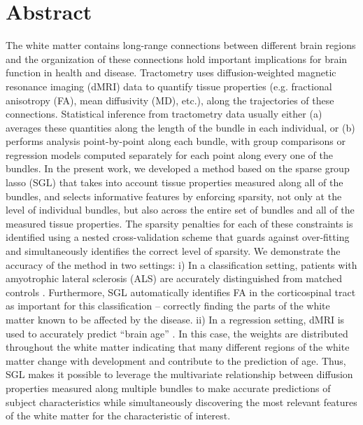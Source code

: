 \section*{Abstract}

The white matter contains long-range connections between different
brain regions and the organization of these connections hold important
implications for brain function in health and disease. Tractometry
uses diffusion-weighted magnetic resonance imaging (dMRI) data
to quantify tissue properties (e.g. fractional anisotropy (FA),
mean diffusivity (MD), etc.), along the trajectories of these
connections\cite{yeatman2012tract}. Statistical inference from
tractometry data usually either (a) averages these quantities along
the length of the bundle in each individual, or (b) performs analysis
point-by-point along each bundle, with group comparisons or regression
models computed separately for each point along every one of the bundles.
In the present work, we developed a method based on the sparse group
lasso (SGL) \cite{simon2013sparse} that takes into account tissue
properties measured along all of the bundles, and selects informative
features by enforcing sparsity, not only at the level of individual
bundles, but also across the entire set of bundles and all of the measured
tissue properties. The sparsity penalties for each of these constraints
is identified using a nested cross-validation scheme that guards
against over-fitting and simultaneously identifies the correct
level of sparsity. We demonstrate the accuracy of the method in two
settings: i) In a classification setting, patients with amyotrophic
lateral sclerosis (ALS) are accurately distinguished from matched
controls \cite{sarica2017corticospinal}. Furthermore, SGL automatically
identifies FA in the corticospinal tract as important for this
classification -- correctly finding the parts of the white matter known
to be affected by the disease. ii) In a regression setting, dMRI is
used to accurately predict ``brain age'' \cite{yeatman2014lifespan,
Brown2012-so}. In this case, the weights are distributed throughout the
white matter indicating that many different regions of the white matter
change with development and contribute to the prediction of age. Thus,
SGL makes it possible to leverage the multivariate relationship between
diffusion properties measured along multiple bundles to make accurate
predictions of subject characteristics while simultaneously discovering
the most relevant features of the white matter for the characteristic of
interest.
